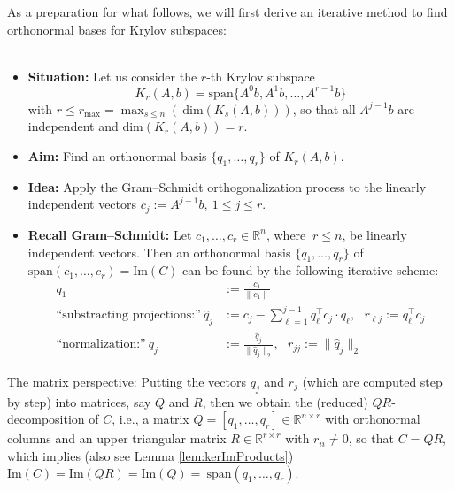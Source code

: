 \begin{frame}
	As a preparation for what follows, we will first derive an iterative method to find orthonormal bases for Krylov subspaces:\\~\\
	
\begin{itemize}
	\item \textbf{Situation:} Let us consider the $r$-th Krylov subspace $$K_r(A,b)=\text{span}\{A^0b,A^1b,\ldots, A^{r-1}b\}$$ with $r\leq r_{\text{max}}=\max_{s\leq n}\left(~\text{dim}(K_s(A,b))\right)$, so that all $A^{j-1}b$ are independent and $\text{dim}(K_r(A,b))=r$.
%
\item\textbf{Aim:} Find an {orthonormal} basis $\{q_1,\ldots, q_r\}$ of $K_r(A,b)$.
%
\item\textbf{Idea:} Apply the Gram--Schmidt orthogonalization process to the linearly independent vectors $c_j:=A^{j-1}b,~1\leq j \leq r$.
\item\textbf{Recall Gram--Schmidt:} Let	$c_1,\dots,c_r\in\mathbb{R}^n$, where $~r\leq n$, be linearly independent vectors. Then an orthonormal basis $\{q_1,\dots,q_{r}\}$ of $\text{span}(c_1,\ldots, c_r)=\text{Im}(C)$ can be found by the following iterative scheme:
		\begin{align*}
		q_1&:=\frac{c_1}{\|c_1\|}\\
		\text{``substracting projections:''}~\widehat{q}_j&:= c_j-\sum_{\ell=1}^{j-1}q_\ell^\top c_j\cdot q_\ell,~~~r_{\ell j} := q_\ell^\top c_j\\
		\text{``normalization:''}~q_j&:=\frac{\widehat{q}_j}{\|\widehat{q}_j\|_2},~~~r_{jj}:=\|\widehat{q}_j\|_2
		\end{align*}
\end{itemize}
		\small
		The matrix perspective: Putting the vectors $q_j$ and $r_j$ (which are computed step by step) into matrices, say $Q$ and $R$, then we obtain the (reduced) $QR$-decomposition of $C$, i.e., a matrix $Q=[q_1,\ldots, q_r]\in\mathbb{R}^{n\times r}$ with orthonormal columns and an upper triangular matrix $R\in\mathbb{R}^{r\times r}$ with $r_{ii}\neq0$, so that $C=QR$, which implies (also see Lemma \ref{lem:kerImProducts}) $\text{Im}(C)=\text{Im}(QR)= \text{Im}(Q) =~\text{span}(q_1,\dots,q_r).$
\end{frame}

